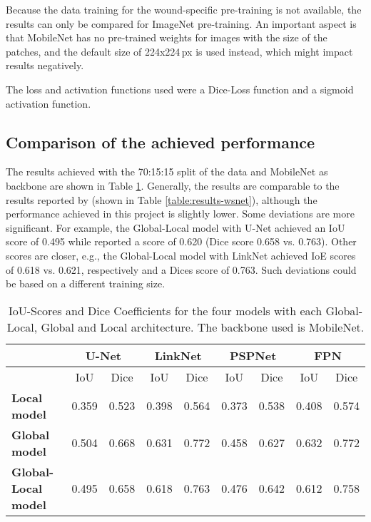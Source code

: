 Because the data training for the wound-specific pre-training is not available, the results can only be compared for ImageNet pre-training. An important aspect is that MobileNet has no pre-trained weights for images with the size of the patches, and the default size of 224x224\,px is used instead, which might impact results negatively.

The loss and activation functions used were a Dice-Loss function and a sigmoid activation function.

\subsection{Comparison of the achieved performance}

The results achieved with the 70:15:15 split of the data and MobileNet as backbone are shown in Table \ref{fig:results-own}. Generally, the results are comparable to the results reported by \citeauthor{Oota_2023_WACV} (shown in Table \ref{table:results-wsnet}), although the performance achieved in this project is slightly lower. Some deviations are more significant. For example, the Global-Local model with U-Net achieved an IoU score of 0.495 while \citeauthor{Oota_2023_WACV} reported a score of 0.620 (Dice score 0.658 vs. 0.763). Other scores are closer, e.g., the Global-Local model with LinkNet achieved IoE scores of 0.618 vs. 0.621, respectively and a Dices score of 0.763. Such deviations could be based on a different training size.

\begin{table}[htb!]
	\centering
	\begin{tabular}{l||c | c | c | c | c | c | c | c|}
	& \multicolumn{2}{|c|}{U-Net} & \multicolumn{2}{|c|}{LinkNet} & \multicolumn{2}{|c|}{PSPNet} & \multicolumn{2}{|c|}{FPN} \\
	\hline
	& IoU & Dice & IoU & Dice & IoU & Dice & IoU & Dice \\
	\hline\hline
	\textbf{Local model} & 0.359 & 0.523 & 0.398 & 0.564 & 0.373 & 0.538 & 0.408 & 0.574 \\	
	\textbf{Global model} & 0.504 & 0.668 & 0.631 & 0.772 & 0.458 & 0.627 & 0.632 & 0.772 \\
	\textbf{Global-Local model} & 0.495 & 0.658 & 0.618 & 0.763 & 0.476 & 0.642 & 0.612 & 0.758\\
	\end{tabular}
	\caption{IoU-Scores and Dice Coefficients for the four models with each Global-Local, Global and Local architecture. The backbone used is MobileNet.}
	\label{fig:results-own}
\end{table}

